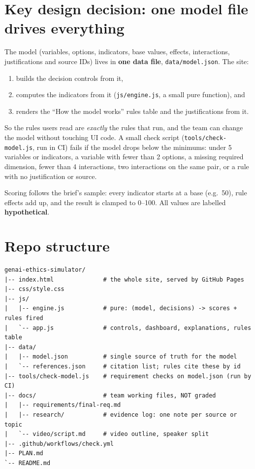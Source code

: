 \documentclass[11pt,a4paper]{article}
\newcommand{\code}[1]{\texttt{#1}}
\begin{document}
\section{Key design decision: one model file drives everything}

The model (variables, options, indicators, base values, effects, interactions, justifications and
source IDs) lives in \textbf{one data file}, \code{data/model.json}. The site:
\begin{enumerate}
  \item builds the decision controls from it,
  \item computes the indicators from it (\code{js/engine.js}, a small pure function), and
  \item renders the ``How the model works'' rules table and the justifications from it.
\end{enumerate}

So the rules users read are \emph{exactly} the rules that run, and the team can change the model
without touching UI code. A small check script (\code{tools/check-model.js}, run in CI) fails if the
model drops below the minimums: under 5 variables or indicators, a variable with fewer than 2
options, a missing required dimension, fewer than 4 interactions, two interactions on the same
pair, or a rule with no justification or source.

Scoring follows the brief's sample: every indicator starts at a base (e.g.\ 50), rule effects add
up, and the result is clamped to 0--100. All values are labelled \textbf{hypothetical}.

\section{Repo structure}

\begin{verbatim}
genai-ethics-simulator/
|-- index.html              # the whole site, served by GitHub Pages
|-- css/style.css
|-- js/
|   |-- engine.js           # pure: (model, decisions) -> scores + rules fired
|   `-- app.js              # controls, dashboard, explanations, rules table
|-- data/
|   |-- model.json          # single source of truth for the model
|   `-- references.json     # citation list; rules cite these by id
|-- tools/check-model.js    # requirement checks on model.json (run by CI)
|-- docs/                   # team working files, NOT graded
|   |-- requirements/final-req.md
|   |-- research/           # evidence log: one note per source or topic
|   `-- video/script.md     # video outline, speaker split
|-- .github/workflows/check.yml
|-- PLAN.md
`-- README.md
\end{verbatim}
\end{document}
